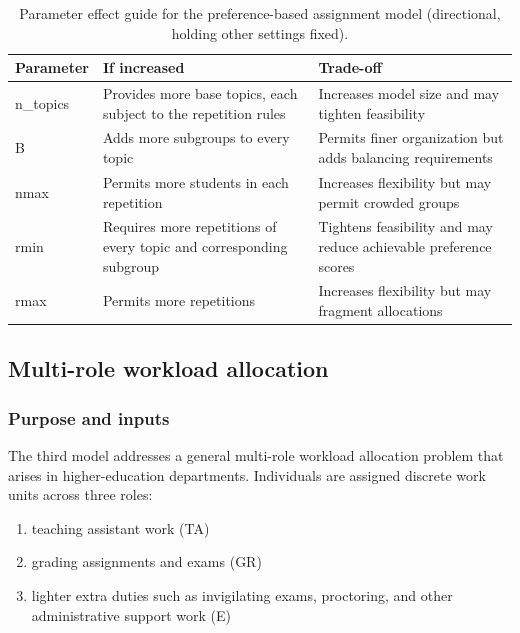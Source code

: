 \begin{table}[!h]
\centering
\caption{\label{tab:pba-param-guide}Parameter effect guide for the preference-based assignment model (directional, holding other settings fixed).}
\centering
\fontsize{9}{11}\selectfont
\begin{tabular}[t]{>{\raggedright\arraybackslash}p{2cm}>{\raggedright\arraybackslash}p{5.5cm}>{\raggedright\arraybackslash}p{5.5cm}}
\toprule
Parameter & If increased & Trade-off\\
\midrule
n\_topics & Provides more base topics, each subject to the repetition rules & Increases model size and may tighten feasibility\\
B & Adds more subgroups to every topic & Permits finer organization but adds balancing requirements\\
nmax & Permits more students in each repetition & Increases flexibility but may permit crowded groups\\
rmin & Requires more repetitions of every topic and corresponding subgroup & Tightens feasibility and may reduce achievable preference scores\\
rmax & Permits more repetitions & Increases flexibility but may fragment allocations\\
\bottomrule
\end{tabular}
\end{table}

\subsection{Multi-role workload allocation}\label{multi-role-workload-allocation}

\subsubsection{Purpose and inputs}\label{purpose-and-inputs-2}

The third model addresses a general multi-role workload allocation problem
that arises in higher-education departments. Individuals are assigned
discrete work units across three roles:

\begin{enumerate}
\def\labelenumi{\arabic{enumi}.}
\tightlist
\item
  teaching assistant work (TA)
\item
  grading assignments and exams (GR)
\item
  lighter extra duties such as invigilating exams, proctoring, and other administrative support work (E)
\end{enumerate}

